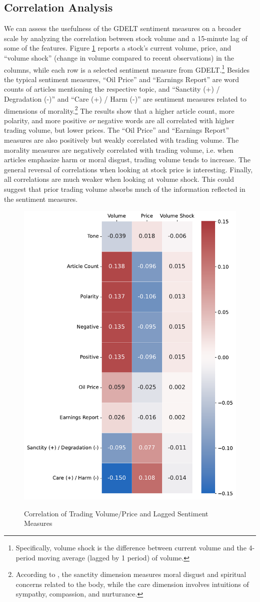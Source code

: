 \documentclass[12pt]{article}
\begin{document}
\subsection{Correlation Analysis}
We can assess the usefulness of the GDELT sentiment measures on a broader scale by analyzing the correlation between stock volume and a 15-minute lag of some of the features. Figure \ref{fig:lagged_volume} reports a stock's current volume, price, and ``volume shock'' (change in volume compared to recent observations) in the columns, while each row is a selected sentiment measure from GDELT.\footnote{Specifically, volume shock is the difference between current volume and the 4-period moving average (lagged by 1 period) of volume.} Besides the typical sentiment measures, ``Oil Price'' and ``Earnings Report'' are word counts of articles mentioning the respective topic, and ``Sanctity (+) / Degradation (-)'' and ``Care (+) / Harm (-)'' are sentiment measures related to dimensions of morality.\footnote{According to \textcite{hopp2021extended}, the sanctity dimension measures moral disgust and spiritual concerns related to the body, while the care dimension involves intuitions of sympathy, compassion, and nurturance.} The results show that a higher article count, more polarity, and more positive \textit{or} negative words are all correlated with higher trading volume, but lower prices. The ``Oil Price'' and ``Earnings Report'' measures are also positively but weakly correlated with trading volume. The morality measures are negatively correlated with trading volume, i.e. when articles emphasize harm or moral disgust, trading volume tends to increase. The general reversal of correlations when looking at stock price is interesting. Finally, all correlations are much weaker when looking at  volume shock. This could suggest that prior trading volume absorbs much of the information reflected in the sentiment measures.

\begin{figure}[H]
    \centering
    \caption{Correlation of Trading Volume/Price and Lagged Sentiment Measures}
    \includegraphics[width=0.6\linewidth]{../Output/correlations.pdf}
    \label{fig:lagged_volume}
\end{figure}
\end{document}
